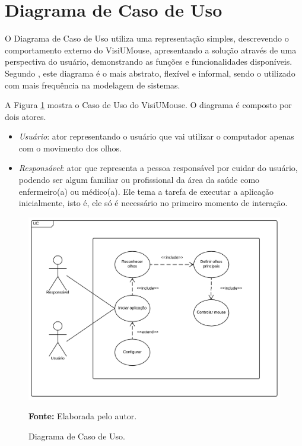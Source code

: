 \section{Diagrama de Caso de Uso}

O Diagrama de Caso de Uso utiliza uma representação simples, descrevendo o comportamento externo do VisiUMouse, apresentando a solução através de uma perspectiva do usuário, demonstrando as funções e funcionalidades disponíveis. Segundo , este diagrama é o mais abstrato, flexível e informal, sendo o utilizado com mais frequência na modelagem de sistemas.%

A Figura \ref{fig:use-case-diagram} mostra o Caso de Uso do VisiUMouse. O diagrama é composto por dois atores. 
\begin{itemize}
\item \textit{Usuário}: ator representando o usuário que vai utilizar o computador apenas com o movimento dos olhos. %

\item  \textit{Responsável}: ator que representa a pessoa responsável por cuidar do usuário, podendo ser algum familiar ou profissional da área da saúde como enfermeiro(a) ou médico(a). Ele tema a tarefa de executar a aplicação inicialmente, isto é, ele só é necessário no primeiro momento de interação. 

\end{itemize}


\begin{figure}[H]
\caption{Diagrama de Caso de Uso.}
\centering \includegraphics[scale=.5]{img/UseCase_Diagram_2.png}

{\fontsize{11}{11}\selectfont \textbf{Fonte:} Elaborada pelo autor.}
\label{fig:use-case-diagram}
\end{figure}


